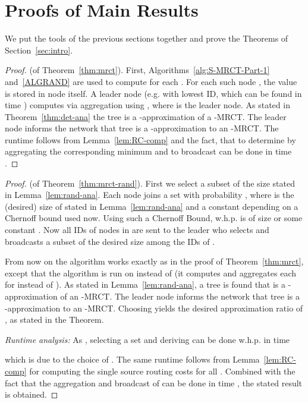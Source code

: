 \documentclass[11pt]{article}
\begin{document}
\section{Proofs of Main Results}\label{sec:final}
We put the tools of the previous sections together and prove the Theorems of Section~\ref{sec:intro}.
\begin{proof}(of Theorem~\ref{thm:mrct}).
First, Algorithms~\ref{alg:S-MRCT-Part-1} and~\ref{ALGRAND} are used to compute  for each . For each such node , the value  is stored in node  itself. A leader node (e.g. with lowest ID, which can be found in time ) computes  via aggregation using , where  is the leader node. As stated in Theorem~\ref{thm:det-ana} the tree  is a -approximation of a -MRCT. The leader node informs the network that tree  is a -approximation to an -MRCT.
The runtime follows from Lemma~\ref{lem:RC-comp} and the fact, that to determine  by aggregating the corresponding minimum and to broadcast  can be done in time .
\end{proof}
\begin{proof}(of Theorem~\ref{thm:mrct-rand}).
First we select a subset  of the size stated in Lemma~\ref{lem:rand-ana}. 
Each node joins a set  with probability , where  is the (desired) size of  stated in Lemma~\ref{lem:rand-ana} and  a constant depending on a Chernoff bound used now. Using such a Chernoff Bound, w.h.p.  is of size  or some constant . Now all IDs of nodes in  are sent to the leader who selects and broadcasts a subset  of the desired size among the IDs of .  
 
From now on the algorithm works exactly as in the proof of Theorem~\ref{thm:mrct}, except that the algorithm is run on  instead of  (it computes and aggregates each  for  instead of ). As stated in Lemma~\ref{lem:rand-ana}, a tree  is found that is a -approximation of an -MRCT. The leader node informs the network that tree  is a -approximation to an -MRCT. Choosing  yields the desired approximation ratio of , as stated in the Theorem.

\emph{Runtime analysis:} As , selecting a set  and deriving  can be done w.h.p. in time 

which is  due to the choice of . The same runtime follows from Lemma~\ref{lem:RC-comp} for computing the single source routing costs for all . Combined with the fact that the aggregation and broadcast of  can be done in time , the stated result is obtained.
\end{proof}
\end{document}
